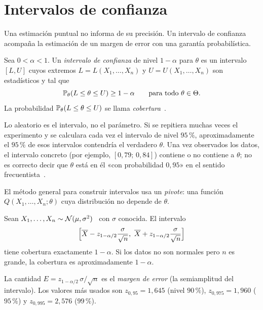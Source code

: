 \section{Intervalos de confianza}

Una estimación puntual no informa de su precisión. Un intervalo de confianza acompaña la estimación de un margen de error con una garantía probabilística.

\begin{definicion}\label{def:t4-ic}
Sea $0<\alpha<1$. Un \emph{intervalo de confianza} de nivel $1-\alpha$ para $\theta$ es un intervalo $[L,U]$ cuyos extremos $L=L(X_1,\dots,X_n)$ y $U=U(X_1,\dots,X_n)$ son estadísticos y tal que
\[
\mathbb{P}_\theta(L\le\theta\le U)\ge1-\alpha\qquad\text{para todo }\theta\in\Theta.
\]
La probabilidad $\mathbb{P}_\theta(L\le\theta\le U)$ se llama \emph{cobertura}~\cite[cap.~6]{wasserman}.
\end{definicion}

\begin{observacion}[Interpretación]\label{obs:t4-interpretacion}
Lo aleatorio es el intervalo, no el parámetro. Si se repitiera muchas veces el experimento y se calculara cada vez el intervalo de nivel $95\,\%$, aproximadamente el $95\,\%$ de esos intervalos contendría el verdadero $\theta$. Una vez observados los datos, el intervalo concreto (por ejemplo, $[0{,}79;\allowbreak\,0{,}84]$) contiene o no contiene a $\theta$; no es correcto decir que $\theta$ está en él «con probabilidad $0{,}95$» en el sentido frecuentista~\cite[lectura~23a]{mit1805}.
\end{observacion}

El método general para construir intervalos usa un \emph{pivote}: una función $Q(X_1,\dots,X_n;\theta)$ cuya distribución no depende de $\theta$.

\begin{teorema}\label{teo:t4-ic-z}
Sean $X_1,\dots,X_n\sim\mathcal{N}(\mu,\sigma^{2})$ \iid\ con $\sigma$ conocida. El intervalo
\[
\Bigl[\overline{X}-z_{1-\alpha/2}\frac{\sigma}{\sqrt n},\ \overline{X}+z_{1-\alpha/2}\frac{\sigma}{\sqrt n}\Bigr]
\]
tiene cobertura exactamente $1-\alpha$. Si los datos no son normales pero $n$ es grande, la cobertura es aproximadamente $1-\alpha$.
\end{teorema}

La cantidad $E=z_{1-\alpha/2}\,\sigma/\sqrt n$ es el \emph{margen de error} (la semiamplitud del intervalo). Los valores más usados son $z_{0{,}95}=1{,}645$ (nivel $90\,\%$), $z_{0{,}975}=1{,}960$ ($95\,\%$) y $z_{0{,}995}=2{,}576$ ($99\,\%$).

